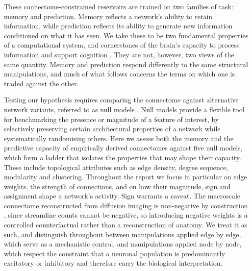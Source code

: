 These connectome-constrained reservoirs are trained on two families of task: memory and prediction. 
Memory reflects a network's ability to retain information, while prediction reflects its ability to 
generate new information conditioned on what it has seen. We take these to be two fundamental properties 
of a computational system, and cornerstones of the brain's capacity to process information and support 
cognition \cite{bar2009proactive}. They are not, however, two views of the same quantity. 
Memory and prediction respond differently to the same structural manipulations, and much of what 
follows concerns the terms on which one is traded against the other.

Testing our hypothesis requires comparing the connectome against alternative network variants, referred 
to as null models \cite{vavsa2022null}. Null models provide a flexible tool for benchmarking the presence 
or magnitude of a feature of interest, by selectively preserving certain architectural properties of a 
network while systematically randomising others. 
Here we assess both the memory and the predictive capacity of 
empirically derived connectomes against five null models, which form a ladder that isolates the 
properties that may shape their capacity. These include topological attributes such as edge density, 
degree sequence, modularity and clustering. Throughout the report we focus in particular on edge 
weights, the strength of connections, and on how their magnitude, sign and assignment shape a network's 
activity. Sign warrants a caveat. The macroscale connectome reconstructed from diffusion imaging is 
non-negative by construction \cite{behrens2012human}, since streamline counts cannot be negative, 
so introducing negative weights is a controlled counterfactual rather than a reconstruction of anatomy. 
We treat it as such, and distinguish throughout between manipulations applied edge by edge, 
which serve as a mechanistic control, and manipulations applied node by node, which respect the 
constraint that a neuronal population is predominantly excitatory or inhibitory and therefore carry 
the biological interpretation.


